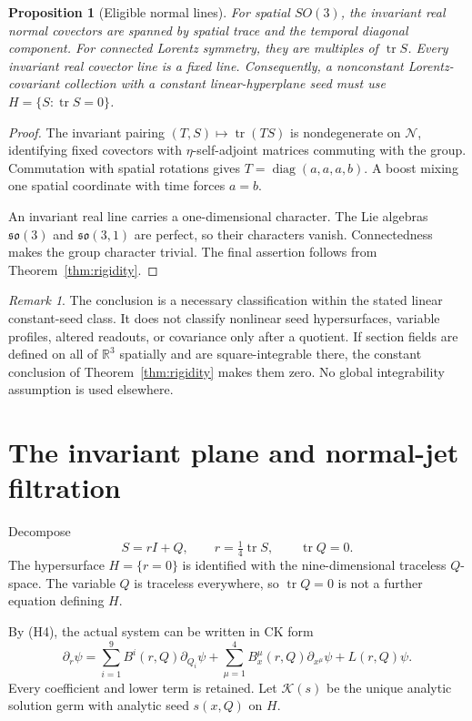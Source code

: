 \documentclass[11pt]{article}
\newtheorem{proposition}[theorem]{Proposition}
\theoremstyle{definition}\newtheorem{definition}[theorem]{Definition}
\theoremstyle{remark}\newtheorem{remark}[theorem]{Remark}
\DeclareMathOperator{\tr}{tr}
\DeclareMathOperator{\diag}{diag}
\newcommand{\R}{\mathbb R}\newcommand{\C}{\mathbb C}
\newcommand{\Ncal}{\mathcal N}\newcommand{\Hobs}{\mathcal H}
\newcommand{\CK}{\mathcal K}\newcommand{\Jet}{\mathcal J}
\begin{document}
\begin{proposition}[Eligible normal lines]\label{prop:lines}
For spatial $SO(3)$, the invariant real normal covectors are spanned by spatial trace and the temporal diagonal component. For connected Lorentz symmetry, they are multiples of $\tr S$. Every invariant real covector line is a fixed line. Consequently, a nonconstant Lorentz-covariant collection with a constant linear-hyperplane seed must use $H=\{S:\tr S=0\}$.
\end{proposition}
\begin{proof}
The invariant pairing $(T,S)\mapsto\tr(TS)$ is nondegenerate on $\Ncal$, identifying fixed covectors with $\eta$-self-adjoint matrices commuting with the group. Commutation with spatial rotations gives $T=\diag(a,a,a,b)$. A boost mixing one spatial coordinate with time forces $a=b$.

An invariant real line carries a one-dimensional character. The Lie algebras $\mathfrak{so}(3)$ and $\mathfrak{so}(3,1)$ are perfect, so their characters vanish. Connectedness makes the group character trivial. The final assertion follows from Theorem~\ref{thm:rigidity}.
\end{proof}

\begin{remark}
The conclusion is a necessary classification within the stated linear constant-seed class. It does not classify nonlinear seed hypersurfaces, variable profiles, altered readouts, or covariance only after a quotient. If section fields are defined on all of $\R^3$ spatially and are square-integrable there, the constant conclusion of Theorem~\ref{thm:rigidity} makes them zero. No global integrability assumption is used elsewhere.
\end{remark}

\section{The invariant plane and normal-jet filtration}\label{sec:CK}
Decompose
\[
 S=rI+Q,\qquad r=\tfrac14\tr S,\qquad\tr Q=0.
\]
The hypersurface $H=\{r=0\}$ is identified with the nine-dimensional traceless $Q$-space. The variable $Q$ is traceless everywhere, so $\tr Q=0$ is not a further equation defining $H$.

By (H4), the actual system can be written in CK form
\begin{equation}\label{eq:CK}
 \partial_r\psi=\sum_{i=1}^9 B^i(r,Q)\partial_{Q_i}\psi
 +\sum_{\mu=1}^4 B_x^\mu(r,Q)\partial_{x^\mu}\psi+L(r,Q)\psi.
\end{equation}
Every coefficient and lower term is retained. Let $\CK(s)$ be the unique analytic solution germ with analytic seed $s(x,Q)$ on $H$.
\end{document}
